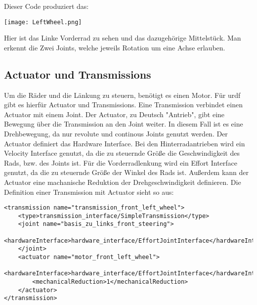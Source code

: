 Dieser Code produziert das:
\begin{center}
    \texttt{[image: LeftWheel.png]}
\end{center}
Hier ist das Linke Vorderrad zu sehen und das dazugehörige Mittelstück.
Man erkennt die Zwei Joints, welche jeweils Rotation um eine Achse erlauben. 

\subsection*{Actuator und Transmissions}
Um die Räder und die Länkung zu steuern, benötigt es einen Motor. 
Für urdf gibt es hierfür Actuator und Transmissions.
Eine Transmission verbindet einen Actuator mit einem Joint. 
Der Actuator, zu Deutsch "Antrieb", gibt eine Bewegung über die Transmission an den Joint weiter.
In diesem Fall ist es eine Drehbewegung, da nur revolute und continous Joints genutzt werden.
Der Actuator definiert das Hardware Interface.
Bei den Hinterradantrieben wird ein Velocity Interface genutzt, da die zu steuernde Größe die Geschwindigkeit des Rads, bzw. des Joints ist.
Für die Vorderradlenkung wird ein Effort Interface genutzt, da die zu steuernde Größe der Winkel des Rads ist.
Außerdem kann der Actuator eine machanische Reduktion der Drehgeschwindigkeit definieren.
Die Definition einer Transmission mit Actuator sieht so aus: 
\begin{lstlisting}
<transmission name="transmission_front_left_wheel">
    <type>transmission_interface/SimpleTransmission</type>
    <joint name="basis_zu_links_front_steering">
        <hardwareInterface>hardware_interface/EffortJointInterface</hardwareInterface>
    </joint>
    <actuator name="motor_front_left_wheel">
        <hardwareInterface>hardware_interface/EffortJointInterface</hardwareInterface>
        <mechanicalReduction>1</mechanicalReduction>
    </actuator>
</transmission>
\end{lstlisting}

